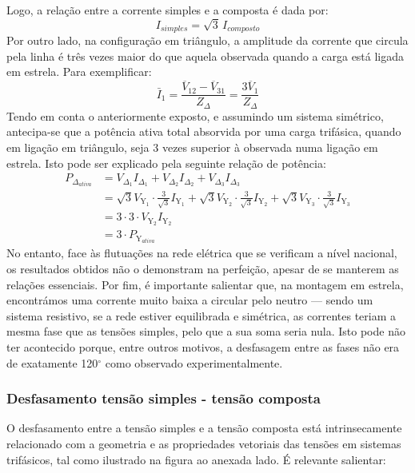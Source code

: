 \noindent Logo, a relação entre a corrente simples e a composta é dada por:
$$
    I_{simples}=\sqrt{3}\, I_{composto} 
$$
Por outro lado, na configuração em triângulo, a amplitude da corrente que circula pela linha é três vezes maior do que aquela observada quando a carga está ligada em estrela. Para exemplificar:
$$
    \boxed{\bar{I}_1 = \dfrac{\overline{V}_{12} - \overline{V}_{31}}{Z_\Delta} = \dfrac{3\overline{V}_1}{Z_\Delta}}
$$
Tendo em conta o anteriormente exposto, e assumindo um sistema simétrico, antecipa-se que a potência ativa total absorvida por uma carga trifásica, quando em ligação em triângulo, seja 3 vezes superior à observada numa ligação em estrela. Isto pode ser explicado pela seguinte relação de potência:
$$
\begin{aligned}
    P_{\Delta_{ativa}} &= V_{\Delta_{1}} I_{\Delta_{1}} + V_{\Delta_{2}} I_{\Delta_{2}} + V_{\Delta_{3}} I_{\Delta_{3}}\\
    &= \sqrt{3}V_{\text{Y}_1}\cdot\frac{3}{\sqrt{3}}I_{\text{Y}_1} + \sqrt{3}V_{\text{Y}_2}\cdot\frac{3}{\sqrt{3}}I_{\text{Y}_2} + \sqrt{3}V_{\text{Y}_3}\cdot\frac{3}{\sqrt{3}}I_{\text{Y}_3}\\
    &= 3 \cdot 3 \cdot V_{\text{Y}_2}I_{\text{Y}_2}\\
    &= 3 \cdot P_{\text{Y}_{ativa}}
\end{aligned}
$$
No entanto, face às flutuações na rede elétrica que se verificam a nível nacional, os resultados obtidos não o demonstram na perfeição, apesar de se manterem as relações essenciais. Por fim, é importante salientar que, na montagem em estrela, encontrámos uma corrente muito baixa a circular pelo neutro --- sendo um sistema resistivo, se a rede estiver equilibrada e simétrica, as correntes teriam a mesma fase que as tensões simples, pelo que a sua soma seria nula. Isto pode não ter acontecido porque, entre outros motivos, a desfasagem entre as fases não era de exatamente 120$^{\circ}$ como observado experimentalmente.
\subsubsection*{Desfasamento tensão simples - tensão composta}

O desfasamento entre a tensão simples e a tensão composta está intrinsecamente relacionado com a geometria e as propriedades vetoriais das tensões em sistemas trifásicos, tal como ilustrado na figura ao anexada lado. É relevante salientar:

